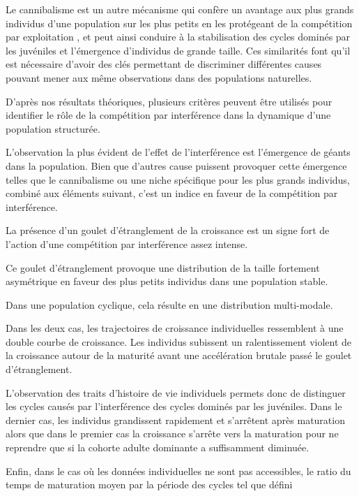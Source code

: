 Le cannibalisme est un autre mécanisme qui confère un avantage aux
plus grands individus d'une population sur les plus petits en les protégeant de la
compétition par exploitation \autocites{claessen2000a,claessen2002a}, et peut
ainsi conduire à la stabilisation des cycles dominés par les juvéniles et
l'émergence d'individus de grande taille. Ces similarités font qu'il est
nécessaire d'avoir des clés permettant de discriminer différentes causes pouvant
mener aux même observations dans des populations naturelles. 

D'après nos résultats théoriques, plusieurs critères peuvent être utilisés pour
identifier le rôle de la compétition par interférence dans la dynamique d'une
population structurée. 
\begin{enumerate*}[label=(\roman*)]
\item L'observation la plus évident de l'effet de l'interférence est l'émergence
de géants dans la population. Bien que d'autres cause puissent provoquer cette
émergence telles que le cannibalisme ou une niche spécifique pour les plus
grands individus, combiné aux éléments suivant, c'est un indice en faveur
de la compétition par interférence. 
\item La présence d'un goulet d'étranglement de la croissance est un signe fort
de l'action d'une compétition par interférence assez intense.
\item Ce goulet d'étranglement provoque une distribution de la taille
fortement asymétrique en faveur des plus petits individus dans une population
stable. 
\item Dans une population cyclique, cela résulte en une distribution
multi-modale.
\item Dans les deux cas, les trajectoires de croissance individuelles
ressemblent à une double courbe de croissance. Les individus subissent un
ralentissement violent de la croissance autour de la maturité avant une
accélération brutale passé le goulet d'étranglement. 
\item L'observation des traits d'histoire de vie individuels permets donc de
distinguer les cycles causés par l'interférence des cycles dominés par les
juvéniles. Dans le dernier cas, les individus grandissent rapidement et
s'arrêtent après maturation alors que dans le premier cas la croissance s'arrête
vers la maturation pour ne reprendre que si la cohorte adulte dominante a
suffisamment diminuée. 
\item Enfin, dans le cas où les données individuelles ne sont pas accessibles,
le ratio du temps de maturation moyen par la période des cycles tel que défini

\end{enumerate*}
